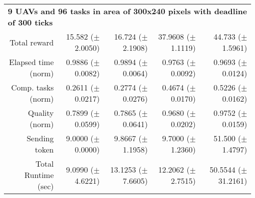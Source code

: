 \begin{table}
\begin{tabular}{rrrrr}
		\multicolumn{5}{l}{\textbf{9 UAVs and 96 tasks in area of 300x240 pixels with deadline of 300 ticks}} \\
	Total reward           &  15.582  ($\pm$2.0050) & 16.724   ($\pm$2.1908)  & 37.9608  ($\pm$1.1119) & 44.733  ($\pm$1.5961)   \\
	Elapsed time (norm)    &  0.9886  ($\pm$0.0082) & 0.9894   ($\pm$0.0064)  &  0.9763  ($\pm$0.0092) & 0.9693  ($\pm$0.0124)    \\ 
	Comp. tasks (norm)     &  0.2611  ($\pm$0.0217) & 0.2774   ($\pm$0.0276)  &  0.4674  ($\pm$0.0170) & 0.5226  ($\pm$0.0162)    \\ 
	Quality (norm)         &  0.7899  ($\pm$0.0599) & 0.7865   ($\pm$0.0641)  &  0.9680  ($\pm$0.0202) & 0.9752  ($\pm$0.0159)   \\ 
	Sending token          &  9.0000  ($\pm$0.0000) &  9.8667  ($\pm$1.1958)  &  9.7000  ($\pm$1.2360) &  51.500 ($\pm$1.4797)   \\ 
	Total Runtime (sec)    &  9.0990  ($\pm$4.6221) &  13.1253 ($\pm$7.6605)  & 12.2062  ($\pm$2.7515) & 50.5544 ($\pm$31.2161)   \\ [1ex]
		
		\hline
	\end{tabular}
\end{table} 